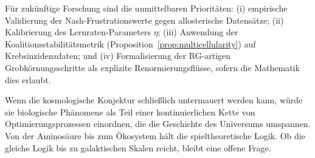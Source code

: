 \documentclass[12pt,a4paper]{article}
\theoremstyle{remark}
\begin{document}
F\"ur zuk\"unftige Forschung sind die unmittelbaren Priorit\"aten: (i) empirische Validierung der Nash-Frustrationswerte gegen allosterische Datens\"atze; (ii) Kalibrierung des Lernraten-Parameters $\eta$; (iii) Anwendung der Koalitionsstabilit\"atsmetrik (Proposition~\ref{prop:multicellularity}) auf Krebsinzidenzdaten; und (iv) Formalisierung der RG-artigen Grobk\"ornungsschritte als explizite Renormierungsfl\"usse, sofern die Mathematik dies erlaubt.

Wenn die kosmologische Konjektur schlie\ss{}lich untermauert werden kann, w\"urde sie biologische Ph\"anomene als Teil einer kontinuierlichen Kette von Optimierungsprozessen einordnen, die die Geschichte des Universums umspannen. Von der Aminos\"aure bis zum \"Okosystem h\"alt die spieltheoretische Logik. Ob die gleiche Logik bis zu galaktischen Skalen reicht, bleibt eine offene Frage.

\end{document}
